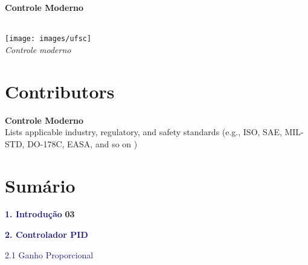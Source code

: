 \documentclass[a4]{article}
\let\oldtextbf\textbf
\renewcommand{\textbf}[1]{\textcolor{customgreen}{\oldtextbf{#1}}}
\begin{document}
\begin{titlepage}

    \centering
    \vspace*{3cm}
    {\Huge\bfseries Controle Moderno \\[1.5em]}

    {\large\textit{}}\\[7em]
    \texttt{[image: images/ufsc]}\\[1em]
    {\Large \textit{Controle moderno}}
    \vfill
\end{titlepage}

\newpage
\section*{Contributors}
\begin{center}
    \Large\textbf{Controle Moderno}\\[2em]
    \large Lists applicable industry, regulatory, and safety standards (e.g., ISO, SAE, MIL-
     STD, DO-178C, EASA, and so on )%

\end{center}

\newpage
\section*{Sumário}
\renewcommand{\contentsname}{}

\begin{tcolorbox}[colback=cyan!15, colframe=white, boxrule=0pt, arc=0pt]
\textbf{\textcolor{MidnightBlue}{1. Introdução}} \hfill \textbf{03}
\end{tcolorbox}

\begin{tcolorbox}[colback=cyan!15, colframe=white, boxrule=0pt, arc=0pt]
\textbf{\textcolor{MidnightBlue}{2. Controlador PID}} \hfill \textbf{\pageref{sec:pid}}
\end{tcolorbox}

\begin{tcolorbox}[colback=cyan!05, colframe=white, boxrule=0pt, arc=0pt, left=5mm]
\textcolor{MidnightBlue}{2.1 Ganho Proporcional} \hfill \textbf{\pageref{subsec:ganho_proporcional}}
\end{tcolorbox}
\end{document}
